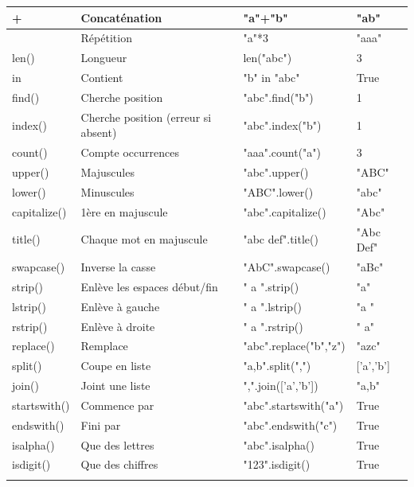 \documentclass[12pt,a4paper]{article}
\begin{document}
\begin{longtable}{|>{\ttfamily}m{2.5cm}|m{3cm}|>{\ttfamily}m{4cm}|m{2.5cm}|}
		\rowcolor{grisclair}
		+ & Concaténation & "a"+"b" & "ab" \\
		\hline
		* & Répétition & "a"*3 & "aaa" \\
		\hline
		\rowcolor{grisclair}
		len() & Longueur & len("abc") & 3 \\
		\hline
		in & Contient & "b" in "abc" & True \\
		\hline
		\rowcolor{grisclair}
		find() & Cherche position & "abc".find("b") & 1 \\
		\hline
		index() & Cherche position (erreur si absent) & "abc".index("b") & 1 \\
		\hline
		\rowcolor{grisclair}
		count() & Compte occurrences & "aaa".count("a") & 3 \\
		\hline
		upper() & Majuscules & "abc".upper() & "ABC" \\
		\hline
		\rowcolor{grisclair}
		lower() & Minuscules & "ABC".lower() & "abc" \\
		\hline
		capitalize() & 1ère en majuscule & "abc".capitalize() & "Abc" \\
		\hline
		\rowcolor{grisclair}
		title() & Chaque mot en majuscule & "abc def".title() & "Abc Def" \\
		\hline
		swapcase() & Inverse la casse & "AbC".swapcase() & "aBc" \\
		\hline
		\rowcolor{grisclair}
		strip() & Enlève les espaces début/fin & " a ".strip() & "a" \\
		\hline
		lstrip() & Enlève à gauche & " a ".lstrip() & "a " \\
		\hline
		\rowcolor{grisclair}
		rstrip() & Enlève à droite & " a ".rstrip() & " a" \\
		\hline
		replace() & Remplace & "abc".replace("b","z") & "azc" \\
		\hline
		\rowcolor{grisclair}
		split() & Coupe en liste & "a,b".split(",") & ['a','b'] \\
		\hline
		join() & Joint une liste & ",".join(['a','b']) & "a,b" \\
		\hline
		\rowcolor{grisclair}
		startswith() & Commence par & "abc".startswith("a") & True \\
		\hline
		endswith() & Fini par & "abc".endswith("c") & True \\
		\hline
		\rowcolor{grisclair}
		isalpha() & Que des lettres & "abc".isalpha() & True \\
		\hline
		isdigit() & Que des chiffres & "123".isdigit() & True \\
		\hline
		\rowcolor{grisclair}

\end{longtable}
\end{document}
